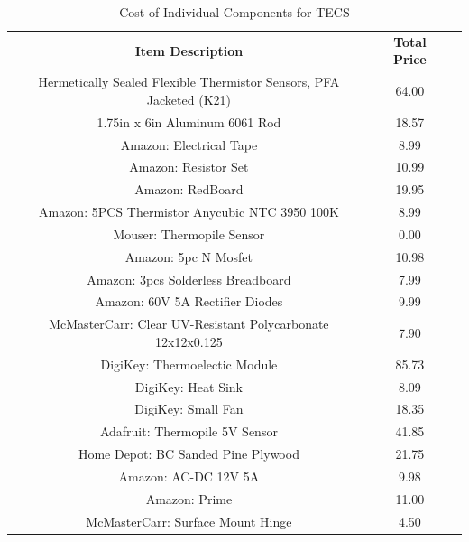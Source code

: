 \documentclass[12pt]{article}
\begin{document}
\begin{table}[B]
\centering
\caption{Cost of Individual Components for TECS}
\label{my-label}
\begin{tabular}{ccc} 
\textbf{Item Description}                                                    & \textbf{Total Price} \\ 
Hermetically Sealed Flexible Thermistor Sensors, PFA Jacketed (K21) & 64.00       \\
1.75in x 6in Aluminum  6061 Rod                                     & 18.57       \\
Amazon: Electrical Tape                                             & 8.99        \\
Amazon: Resistor Set                                                & 10.99       \\
Amazon: RedBoard                                                    & 19.95       \\
Amazon: 5PCS Thermistor Anycubic NTC 3950 100K                      & 8.99        \\
Mouser: Thermopile Sensor                                           & 0.00        \\
Amazon: 5pc N Mosfet                                                & 10.98       \\
Amazon: 3pcs Solderless Breadboard                                  & 7.99        \\
Amazon: 60V 5A Rectifier Diodes                                     & 9.99        \\
McMasterCarr: Clear UV-Resistant Polycarbonate 12x12x0.125          & 7.90        \\
DigiKey: Thermoelectic Module                                       & 85.73       \\
DigiKey: Heat Sink                                                  & 8.09        \\
DigiKey: Small Fan                                                  & 18.35       \\
Adafruit: Thermopile 5V Sensor                                      & 41.85       \\
Home Depot: BC Sanded Pine Plywood                                  & 21.75       \\
Amazon: AC-DC 12V 5A                                                & 9.98        \\
Amazon: Prime                                                       & 11.00       \\
McMasterCarr: Surface Mount Hinge                                   & 4.50        \\

\end{tabular}
\end{table}
\end{document}
